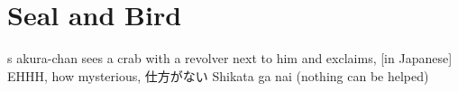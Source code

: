 \chapter{Seal and Bird}
\lettrine[lines=3,loversize=-0.2,lraise=0.2]{s}{} akura-chan sees a crab with a revolver next to him and exclaims, [in Japanese] EHHH, how mysterious, 仕方がない Shikata ga nai (nothing can be helped)
